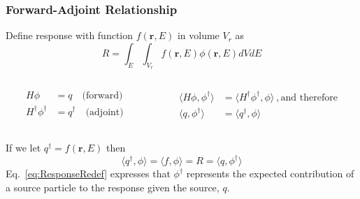 \documentclass[xcolor=x11names,compress]{beamer}
\renewcommand{\(}{\begin{columns}}
\renewcommand{\)}{\end{columns}}
\newcommand{\<}[1]{\begin{column}{#1}}
\renewcommand{\>}{\end{column}}
\newcommand{\ve}[1]{\ensuremath{\mathbf{#1}}}
\begin{document}
\begin{frame}[fragile]
  \frametitle{Forward-Adjoint Relationship}
Define response with function $f(\ve{r}, E)$ in volume $V_r$ as
%
\begin{equation}
 R = \int_E \int_{V_r} f(\ve{r}, E) \phi(\ve{r}, E) dV dE 
 \label{eq:Response}
\end{equation}
%
\begin{columns}
  \begin{column}{0.5\textwidth}
	\begin{align}
  	H\phi &= q \quad \text{(forward)}\nonumber \\
  	H^{\dagger} \phi^{\dagger} &= q^{\dagger} \quad 
  	\text{(adjoint)}\nonumber
  	\end{align}
  \end{column}
  \begin{column}{0.5\textwidth}
  	\begin{align}
  	\langle H\phi, \phi^{\dagger} \rangle &= \langle H^{\dagger} \phi^{\dagger}, \phi \rangle \:, \text{and therefore} \nonumber \\
  	\langle q, \phi^{\dagger} \rangle &= \langle q^{\dagger}, \phi \rangle \nonumber
  	\end{align}
  \end{column}
\end{columns}
\vspace*{1 em}
\pause
If we let $q^{\dagger} = f(\ve{r}, E)$ then
%
\begin{equation}
 \langle q^{\dagger}, \phi \rangle = \langle f, \phi \rangle = R = \langle q, \phi^{\dagger} \rangle
 \label{eq:ResponseRedef}
\end{equation}
%
Eq.\ \eqref{eq:ResponseRedef} expresses that $\phi^{\dagger}$ represents the expected contribution of a source particle to the response given the source, $q$.

\end{frame}
\end{document}
